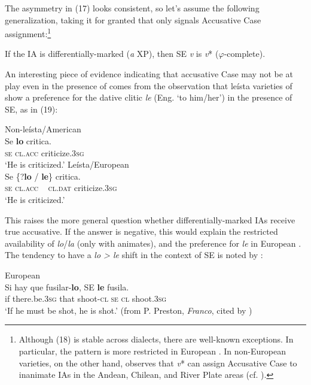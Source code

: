 \documentclass[output=paper]{langsci/langscibook}
\begin{document}
The asymmetry in (17) looks consistent, so let’s assume the following generalization, taking it for granted that only \DOM signals Accusative Case assignment:\footnote{Although (18) is stable across dialects, there are well-known exceptions. In particular, the pattern is more restricted in European . In non-European varieties, on the other hand, \citet[§41.12m]{RAE-ASALE2009} observes that \textit{v}* can assign Accusative Case to inanimate IAs in the Andean, Chilean, and River Plate areas (cf. \citealt{Gallego2016}).}

\ea%
\label{ex:gallego:18}
If the IA is differentially-marked (\textit{a} XP), then SE \textit{v} is \textit{v}* ($\varphi $-complete).
\z

          

An interesting piece of evidence indicating that accusative Case may not be at play even in the presence of \DOM comes from the observation that leísta varieties of  show a preference for the dative clitic \textit{le} (Eng. ‘to him\slash her’) in the presence of SE, as in (19):

\ea%
    \ea
    Non-leísta/American \label{ex:gallego:19}\\
    \gll Se  \textbf{lo}       critica.          \\
              \textsc{se}  \textsc{cl.acc} criticize\textsc{{}.3}\textsc{sg}\\
    \glt      ‘He is criticized.’
    \ex Leísta/European \\
    \gll Se \{?\textbf{lo}    /    \textbf{le}\}       critica.      \\
                 \textsc{se}   \textsc{cl.acc} ~ \textsc{cl.dat}   criticize\textsc{{}.3}\textsc{sg}\\
    \glt      ‘He is criticized.’
    \z
\z   

This raises the more general question whether differentially-marked IAs receive true accusative. If the answer is negative, this would explain the restricted availability of \textit{lo}/\textit{la} (only with animates), and the preference for \textit{le} in European . The tendency to have a \textit{lo > le} shift in the context of SE is noted by \citet{Ordóñez2004}:

\ea%
    European \label{ex:gallego:20}\\
    \gll Si hay                 que  fusilar-\textbf{lo},  SE \textbf{le} fusila.\\
        if  there.be\textsc{{}.3}\textsc{sg}  that  shoot\textsc{{}-cl}  \textsc{se}  \textsc{cl}  shoot\textsc{{}.3}\textsc{sg}\\
    \glt ‘If he must be shot, he is shot.’ (from P. Preston, \textit{Franco}, cited by \citealt{Ordóñez2004})
    \z
\end{document}
